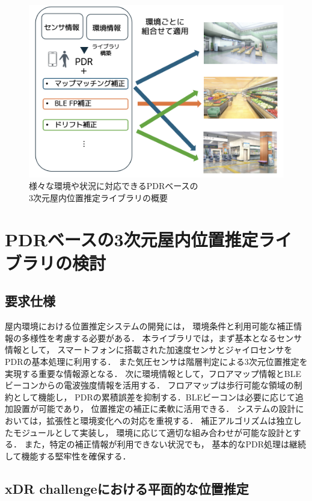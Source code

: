 \documentclass[a4paper, 10pt, twocolumn]{jarticle}
\begin{document}
\begin{figure}[h]
	\centering
	\includegraphics[width=\linewidth]{image/first.png}
	\caption{様々な環境や状況に対応できるPDRベースの\\3次元屋内位置推定ライブラリの概要}    \label{fig:overview}
\end{figure}


\section{PDRベースの3次元屋内位置推定ライブラリの検討}

\subsection{要求仕様}
屋内環境における位置推定システムの開発には，
環境条件と利用可能な補正情報の多様性を考慮する必要がある．
本ライブラリでは，まず基本となるセンサ情報として，
スマートフォンに搭載された加速度センサとジャイロセンサをPDRの基本処理に利用する．
また気圧センサは階層判定による3次元位置推定を実現する重要な情報源となる．
次に環境情報として，フロアマップ情報とBLEビーコンからの電波強度情報を活用する．
フロアマップは歩行可能な領域の制約として機能し，
PDRの累積誤差を抑制する．BLEビーコンは必要に応じて追加設置が可能であり，
位置推定の補正に柔軟に活用できる．
システムの設計においては，拡張性と環境変化への対応を重視する．
補正アルゴリズムは独立したモジュールとして実装し，
環境に応じて適切な組み合わせが可能な設計とする．
また，特定の補正情報が利用できない状況でも，
基本的なPDR処理は継続して機能する堅牢性を確保する．


\subsection{xDR challengeにおける平面的な位置推定}
\end{document}
